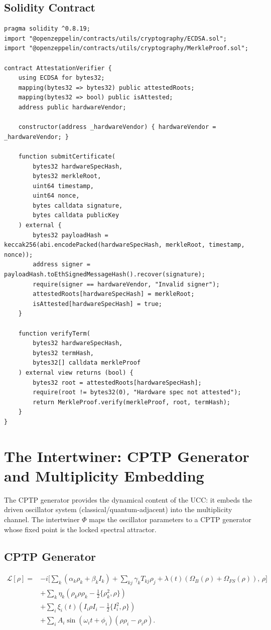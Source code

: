 \documentclass[11pt]{article}
\begin{document}
\subsection{Solidity Contract}
\begin{lstlisting}[style=solidity, caption={AttestationVerifier.sol}]
pragma solidity ^0.8.19;
import "@openzeppelin/contracts/utils/cryptography/ECDSA.sol";
import "@openzeppelin/contracts/utils/cryptography/MerkleProof.sol";

contract AttestationVerifier {
    using ECDSA for bytes32;
    mapping(bytes32 => bytes32) public attestedRoots;
    mapping(bytes32 => bool) public isAttested;
    address public hardwareVendor;

    constructor(address _hardwareVendor) { hardwareVendor = _hardwareVendor; }

    function submitCertificate(
        bytes32 hardwareSpecHash,
        bytes32 merkleRoot,
        uint64 timestamp,
        uint64 nonce,
        bytes calldata signature,
        bytes calldata publicKey
    ) external {
        bytes32 payloadHash = keccak256(abi.encodePacked(hardwareSpecHash, merkleRoot, timestamp, nonce));
        address signer = payloadHash.toEthSignedMessageHash().recover(signature);
        require(signer == hardwareVendor, "Invalid signer");
        attestedRoots[hardwareSpecHash] = merkleRoot;
        isAttested[hardwareSpecHash] = true;
    }

    function verifyTerm(
        bytes32 hardwareSpecHash,
        bytes32 termHash,
        bytes32[] calldata merkleProof
    ) external view returns (bool) {
        bytes32 root = attestedRoots[hardwareSpecHash];
        require(root != bytes32(0), "Hardware spec not attested");
        return MerkleProof.verify(merkleProof, root, termHash);
    }
}
\end{lstlisting}

\section{The Intertwiner: CPTP Generator and Multiplicity Embedding}

The CPTP generator provides the dynamical content of the UCC: it embeds the driven oscillator system (classical/quantum‐adjacent) into the multiplicity channel. The intertwiner \(\Phi\) maps the oscillator parameters to a CPTP generator whose fixed point is the locked spectral attractor.

\subsection{CPTP Generator}
\begin{align*}
\mathcal{L}[\rho] = &-i\Big[\sum_k (\alpha_k \rho_k + \beta_k I_k) + \sum_{kj} \gamma_k T_{kj}\rho_j + \lambda(t)(\Omega_B(\rho)+\Omega_{FS}(\rho)),\,\rho\Big] \\
&+ \sum_k \eta_k \left(\rho_k \rho \rho_k - \frac12\{\rho_k^2,\rho\}\right) \\
&+ \sum_i \xi_i(t) \left(I_i \rho I_i - \frac12\{I_i^2,\rho\}\right) \\
&+ \sum_i A_i \sin(\omega_i t+\phi_i) \left(\rho \rho_i - \rho_i \rho\right).
\end{align*}
\end{document}
